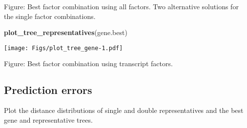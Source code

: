 \documentclass[]{article}
\newenvironment{Shaded}{\begin{snugshade}}{\end{snugshade}}
\newcommand{\KeywordTok}[1]{\textcolor[rgb]{0.13,0.29,0.53}{\textbf{{#1}}}}
\newcommand{\NormalTok}[1]{{#1}}
\begin{document}
Figure: Best factor combination using all factors. Two alternative
solutions for the single factor combinations.

\begin{Shaded}
\begin{Highlighting}[]
\KeywordTok{plot_tree_representatives}\NormalTok{(gene.best)}
\end{Highlighting}
\end{Shaded}

\texttt{[image: Figs/plot\_tree\_gene-1.pdf]}

Figure: Best factor combination using transcript factors.

\subsection{Prediction errors}\label{prediction-errors}

Plot the distance distributions of single and double representatives and
the best gene and representative trees.
\end{document}
